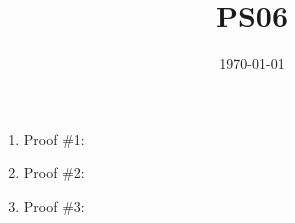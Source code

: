 \documentclass{article}
\title{PS06}
\date{\today}
\begin{document}
\maketitle

\begin{enumerate}[label=\alph*.]
	\item Proof \#1:
	\item Proof \#2:
	\item Proof \#3:
\end{enumerate}
\end{document}
